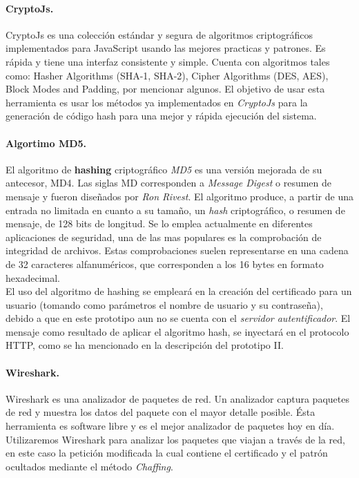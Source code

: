 \documentclass[12pt, a4paper, titlepage]{report}
\begin{document}
			\paragraph{CryptoJs. \\}
				CryptoJs es una colección estándar y segura de algoritmos criptográficos implementados para JavaScript usando las mejores practicas y patrones. Es rápida y tiene una interfaz consistente y simple. Cuenta con algoritmos tales como: Hasher Algorithms (SHA-1, SHA-2), Cipher Algorithms (DES, AES), Block Modes and Padding, por mencionar algunos. \cite{refCryptoJs} El objetivo de usar esta herramienta es usar los métodos ya implementados en \textit{CryptoJs} para la generación de código hash para una mejor y rápida ejecución del sistema.
				
				\paragraph{Algortimo MD5. \\}
				El algoritmo de \textbf{hashing} criptográfico \textit{MD5} es una versión mejorada de su antecesor, MD4. Las siglas MD corresponden a \textit{Message Digest} o resumen de mensaje y fueron diseñados por \textit{Ron Rivest}.
				El algoritmo produce, a partir de una entrada no limitada en cuanto a su tamaño, un \textit{hash} criptográfico, o resumen de mensaje, de 128 bits de longitud. Se lo emplea actualmente en diferentes aplicaciones de seguridad, una de las mas populares es la comprobación de integridad de archivos. Estas comprobaciones suelen representarse en una cadena de 32 caracteres alfanuméricos, que corresponden a los 16 bytes en formato hexadecimal. \cite{refCriptografia}\\
				
				El uso del algoritmo de hashing se empleará en la creación del certificado para un usuario (tomando como parámetros el nombre de usuario y su contraseña), debido a que en este prototipo aun no se cuenta con el \textit{servidor autentificador}. El mensaje como resultado de aplicar el algoritmo hash, se inyectará en el protocolo HTTP, como se ha mencionado en la descripción del prototipo II.
				
				\paragraph{Wireshark. \\}
				Wireshark es una analizador de paquetes de red. Un analizador captura paquetes de red y muestra los datos del paquete con el mayor detalle posible. Ésta herramienta es software libre y es el mejor analizador de paquetes hoy en día. \cite{refWireshark} Utilizaremos Wireshark para analizar los paquetes que viajan a través de la red, en este caso la petición modificada la cual contiene el certificado y el patrón ocultados mediante el método \textit{Chaffing}.
				\label{WiresharkDefinition}
			
\end{document}
